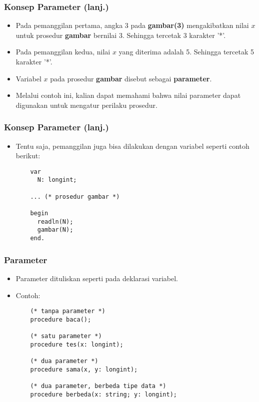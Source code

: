\begin{frame}[fragile]
\frametitle{Konsep Parameter (lanj.)}
\begin{itemize}
  \item Pada pemanggilan pertama, angka 3 pada \textbf{gambar(3)} mengakibatkan nilai $x$ untuk prosedur \textbf{gambar} bernilai 3. Sehingga tercetak 3 karakter '*'.
  \item Pada pemanggilan kedua, nilai $x$ yang diterima adalah 5. Sehingga tercetak 5 karakter '*'.
  \item Variabel $x$ pada prosedur \textbf{gambar} disebut sebagai \alert{\textbf{parameter}}.
  \item Melalui contoh ini, kalian dapat memahami bahwa nilai parameter dapat digunakan untuk mengatur perilaku prosedur.
\end{itemize}
\end{frame}

\begin{frame}[fragile]
\frametitle{Konsep Parameter (lanj.)}
\begin{itemize}
  \item Tentu saja, pemanggilan juga bisa dilakukan dengan variabel seperti contoh berikut:
  \begin{lstlisting}
    var
      N: longint;

    ... (* prosedur gambar *)

    begin
      readln(N);
      gambar(N);
    end.
  \end{lstlisting}
\end{itemize}
\end{frame}

\begin{frame}[fragile]
\frametitle{Parameter}
\begin{itemize}
  \item Parameter dituliskan seperti pada deklarasi variabel.
  \item Contoh:
  \begin{lstlisting}
    (* tanpa parameter *)
    procedure baca();

    (* satu parameter *)
    procedure tes(x: longint);

    (* dua parameter *)
    procedure sama(x, y: longint);

    (* dua parameter, berbeda tipe data *)
    procedure berbeda(x: string; y: longint);
  \end{lstlisting}
\end{itemize}
\end{frame}

